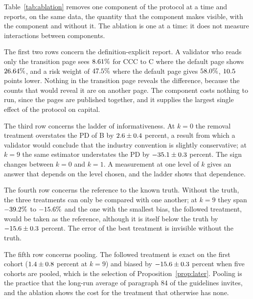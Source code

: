 Table~\ref{tab:ablation} removes one component of the protocol at a time and reports, on the same data, the quantity that the component makes visible, with the component and without it. The ablation is one at a time: it does not measure interactions between components.



The first two rows concern the definition-explicit report. A validator who reads only the transition page sees $8.61\%$ for CCC to C where the default page shows $26.64\%$, and a risk weight of $47.5\%$ where the default page gives $58.0\%$, $10.5$ points lower. Nothing in the transition page reveals the difference, because the counts that would reveal it are on another page. The component costs nothing to run, since the pages are published together, and it supplies the largest single effect of the protocol on capital.

The third row concerns the ladder of informativeness. At $k=0$ the removal treatment overstates the PD of B by $2.6\pm0.4$ percent, a result from which a validator would conclude that the industry convention is slightly conservative; at $k=9$ the same estimator understates the PD by $-35.1\pm0.3$ percent. The sign changes between $k=0$ and $k=1$. A measurement at one level of $k$ gives an answer that depends on the level chosen, and the ladder shows that dependence.

The fourth row concerns the reference to the known truth. Without the truth, the three treatments can only be compared with one another; at $k=9$ they span $-39.2\%$ to $-15.6\%$ and the one with the smallest bias, the followed treatment, would be taken as the reference, although it is itself below the truth by $-15.6\pm0.3$ percent. The error of the best treatment is invisible without the truth.

The fifth row concerns pooling. The followed treatment is exact on the first cohort ($1.4\pm0.8$ percent at $k=9$) and biased by $-15.6\pm0.3$ percent when five cohorts are pooled, which is the selection of Proposition~\ref{prop:later}. Pooling is the practice that the long-run average of paragraph 84 of the guidelines invites, and the ablation shows the cost for the treatment that otherwise has none.

